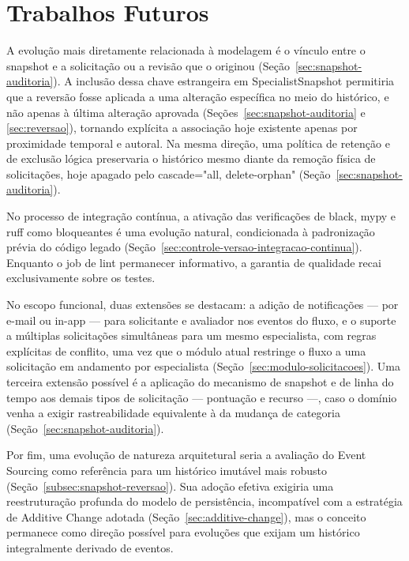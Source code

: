 \section{Trabalhos Futuros}
\label{sec:trabalhos-futuros}

A evolução mais diretamente relacionada à modelagem é o vínculo entre o snapshot e a solicitação ou a revisão que o originou (Seção~\ref{sec:snapshot-auditoria}). A inclusão dessa chave estrangeira em SpecialistSnapshot permitiria que a reversão fosse aplicada a uma alteração específica no meio do histórico, e não apenas à última alteração aprovada (Seções~\ref{sec:snapshot-auditoria} e \ref{sec:reversao}), tornando explícita a associação hoje existente apenas por proximidade temporal e autoral. Na mesma direção, uma política de retenção e de exclusão lógica preservaria o histórico mesmo diante da remoção física de solicitações, hoje apagado pelo cascade="all, delete-orphan" (Seção~\ref{sec:snapshot-auditoria}).

No processo de integração contínua, a ativação das verificações de black, mypy e ruff como bloqueantes é uma evolução natural, condicionada à padronização prévia do código legado (Seção~\ref{sec:controle-versao-integracao-continua}). Enquanto o job de lint permanecer informativo, a garantia de qualidade recai exclusivamente sobre os testes.

No escopo funcional, duas extensões se destacam: a adição de notificações — por e-mail ou in-app — para solicitante e avaliador nos eventos do fluxo, e o suporte a múltiplas solicitações simultâneas para um mesmo especialista, com regras explícitas de conflito, uma vez que o módulo atual restringe o fluxo a uma solicitação em andamento por especialista (Seção~\ref{sec:modulo-solicitacoes}). Uma terceira extensão possível é a aplicação do mecanismo de snapshot e de linha do tempo aos demais tipos de solicitação — pontuação e recurso —, caso o domínio venha a exigir rastreabilidade equivalente à da mudança de categoria (Seção~\ref{sec:snapshot-auditoria}).

Por fim, uma evolução de natureza arquitetural seria a avaliação do Event Sourcing como referência para um histórico imutável mais robusto (Seção~\ref{subsec:snapshot-reversao}). Sua adoção efetiva exigiria uma reestruturação profunda do modelo de persistência, incompatível com a estratégia de Additive Change adotada (Seção~\ref{sec:additive-change}), mas o conceito permanece como direção possível para evoluções que exijam um histórico integralmente derivado de eventos.